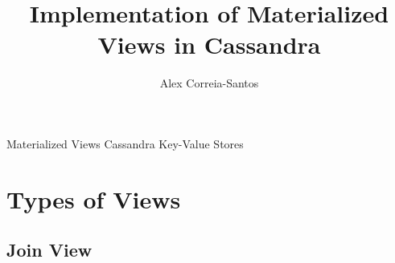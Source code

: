 \documentclass[preprint,12pt]{elsarticle}
\begin{document}
\begin{frontmatter}



\title{Implementation of Materialized Views in Cassandra}


\author{Alex Correia-Santos}

\address{}



\begin{keyword}

Materialized Views
Cassandra
Key-Value Stores
\end{keyword}

\end{frontmatter}


\section{Types of Views}
\subsection{\bf Join View}
\label{}
\end{document}
